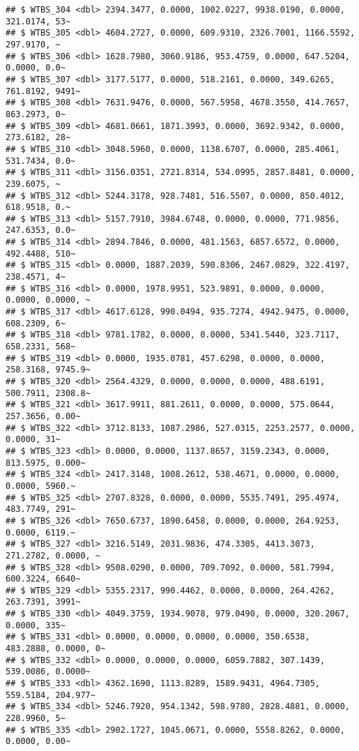 \documentclass[
]{article}
\begin{document}
\begin{verbatim}
## $ WTBS_304 <dbl> 2394.3477, 0.0000, 1002.0227, 9938.0190, 0.0000, 321.0174, 53~
## $ WTBS_305 <dbl> 4604.2727, 0.0000, 609.9310, 2326.7001, 1166.5592, 297.9170, ~
## $ WTBS_306 <dbl> 1628.7980, 3060.9186, 953.4759, 0.0000, 647.5204, 0.0000, 0.0~
## $ WTBS_307 <dbl> 3177.5177, 0.0000, 518.2161, 0.0000, 349.6265, 761.8192, 9491~
## $ WTBS_308 <dbl> 7631.9476, 0.0000, 567.5958, 4678.3550, 414.7657, 863.2973, 0~
## $ WTBS_309 <dbl> 4681.0661, 1871.3993, 0.0000, 3692.9342, 0.0000, 273.6182, 28~
## $ WTBS_310 <dbl> 3048.5960, 0.0000, 1138.6707, 0.0000, 285.4061, 531.7434, 0.0~
## $ WTBS_311 <dbl> 3156.0351, 2721.8314, 534.0995, 2857.8481, 0.0000, 239.6075, ~
## $ WTBS_312 <dbl> 5244.3178, 928.7481, 516.5507, 0.0000, 850.4012, 618.9518, 0.~
## $ WTBS_313 <dbl> 5157.7910, 3984.6748, 0.0000, 0.0000, 771.9856, 247.6353, 0.0~
## $ WTBS_314 <dbl> 2894.7846, 0.0000, 481.1563, 6857.6572, 0.0000, 492.4488, 510~
## $ WTBS_315 <dbl> 0.0000, 1887.2039, 590.8306, 2467.0829, 322.4197, 238.4571, 4~
## $ WTBS_316 <dbl> 0.0000, 1978.9951, 523.9891, 0.0000, 0.0000, 0.0000, 0.0000, ~
## $ WTBS_317 <dbl> 4617.6128, 990.0494, 935.7274, 4942.9475, 0.0000, 608.2309, 6~
## $ WTBS_318 <dbl> 9781.1782, 0.0000, 0.0000, 5341.5440, 323.7117, 658.2331, 568~
## $ WTBS_319 <dbl> 0.0000, 1935.0781, 457.6298, 0.0000, 0.0000, 258.3168, 9745.9~
## $ WTBS_320 <dbl> 2564.4329, 0.0000, 0.0000, 0.0000, 488.6191, 500.7911, 2308.8~
## $ WTBS_321 <dbl> 3617.9911, 881.2611, 0.0000, 0.0000, 575.0644, 257.3656, 0.00~
## $ WTBS_322 <dbl> 3712.8133, 1087.2986, 527.0315, 2253.2577, 0.0000, 0.0000, 31~
## $ WTBS_323 <dbl> 0.0000, 0.0000, 1137.8657, 3159.2343, 0.0000, 813.5975, 0.000~
## $ WTBS_324 <dbl> 2417.3148, 1008.2612, 538.4671, 0.0000, 0.0000, 0.0000, 5960.~
## $ WTBS_325 <dbl> 2707.8328, 0.0000, 0.0000, 5535.7491, 295.4974, 483.7749, 291~
## $ WTBS_326 <dbl> 7650.6737, 1890.6458, 0.0000, 0.0000, 264.9253, 0.0000, 6119.~
## $ WTBS_327 <dbl> 3216.5149, 2031.9836, 474.3305, 4413.3073, 271.2782, 0.0000, ~
## $ WTBS_328 <dbl> 9508.0290, 0.0000, 709.7092, 0.0000, 581.7994, 600.3224, 6640~
## $ WTBS_329 <dbl> 5355.2317, 990.4462, 0.0000, 0.0000, 264.4262, 263.7391, 3991~
## $ WTBS_330 <dbl> 4049.3759, 1934.9078, 979.0490, 0.0000, 320.2067, 0.0000, 335~
## $ WTBS_331 <dbl> 0.0000, 0.0000, 0.0000, 0.0000, 350.6538, 483.2888, 0.0000, 0~
## $ WTBS_332 <dbl> 0.0000, 0.0000, 0.0000, 6059.7882, 307.1439, 539.0086, 0.0000~
## $ WTBS_333 <dbl> 4362.1690, 1113.8289, 1589.9431, 4964.7305, 559.5184, 204.977~
## $ WTBS_334 <dbl> 5246.7920, 954.1342, 598.9780, 2828.4881, 0.0000, 228.9960, 5~
## $ WTBS_335 <dbl> 2902.1727, 1045.0671, 0.0000, 5558.8262, 0.0000, 0.0000, 0.00~

\end{verbatim}
\end{document}
